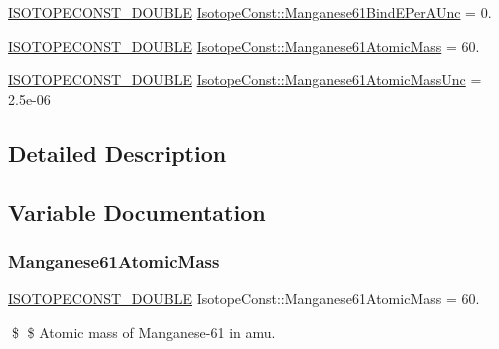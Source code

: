 \begin{DoxyCompactItemize}
\mbox{\hyperlink{group___isotope_const-_macros_ga8f45a7272ce02c0b4c65c44636ed719a}{I\+S\+O\+T\+O\+P\+E\+C\+O\+N\+S\+T\+\_\+\+D\+O\+U\+B\+LE}} \mbox{\hyperlink{group___isotope_const-_manganese-_mn61_ga3ba71498ee25f4ab669a7fab72725384}{Isotope\+Const\+::\+Manganese61\+Bind\+E\+Per\+A\+Unc}} = 0.
\item 
\mbox{\hyperlink{group___isotope_const-_macros_ga8f45a7272ce02c0b4c65c44636ed719a}{I\+S\+O\+T\+O\+P\+E\+C\+O\+N\+S\+T\+\_\+\+D\+O\+U\+B\+LE}} \mbox{\hyperlink{group___isotope_const-_manganese-_mn61_gac9c3c14908eefe9f5d766e0ca9b6f9b2}{Isotope\+Const\+::\+Manganese61\+Atomic\+Mass}} = 60.
\item 
\mbox{\hyperlink{group___isotope_const-_macros_ga8f45a7272ce02c0b4c65c44636ed719a}{I\+S\+O\+T\+O\+P\+E\+C\+O\+N\+S\+T\+\_\+\+D\+O\+U\+B\+LE}} \mbox{\hyperlink{group___isotope_const-_manganese-_mn61_ga9a6dd99a3b599fd45295b0d43bd3e21c}{Isotope\+Const\+::\+Manganese61\+Atomic\+Mass\+Unc}} = 2.\+5e-\/06
\end{DoxyCompactItemize}


\subsection{Detailed Description}


\subsection{Variable Documentation}
\mbox{\label{group___isotope_const-_manganese-_mn61_gac9c3c14908eefe9f5d766e0ca9b6f9b2}} 
\subsubsection{\texorpdfstring{Manganese61\+Atomic\+Mass}{Manganese61AtomicMass}}
{\footnotesize\ttfamily \mbox{\hyperlink{group___isotope_const-_macros_ga8f45a7272ce02c0b4c65c44636ed719a}{I\+S\+O\+T\+O\+P\+E\+C\+O\+N\+S\+T\+\_\+\+D\+O\+U\+B\+LE}} Isotope\+Const\+::\+Manganese61\+Atomic\+Mass = 60.}

\$ \$ Atomic mass of Manganese-\/61 in amu. \mbox{\label{group___isotope_const-_manganese-_mn61_ga9a6dd99a3b599fd45295b0d43bd3e21c}} 
